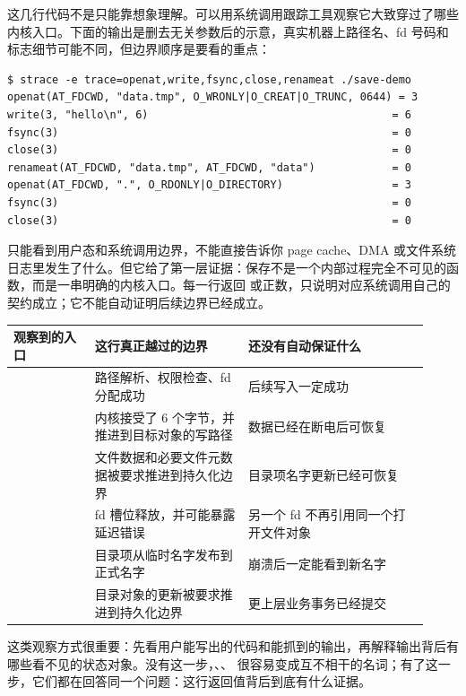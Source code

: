 这几行代码不是只能靠想象理解。可以用系统调用跟踪工具观察它大致穿过了哪些内核入口。下面的输出是删去无关参数后的示意，真实机器上路径名、fd 号码和标志细节可能不同，但边界顺序是要看的重点：

\begin{lstlisting}
$ strace -e trace=openat,write,fsync,close,renameat ./save-demo
openat(AT_FDCWD, "data.tmp", O_WRONLY|O_CREAT|O_TRUNC, 0644) = 3
write(3, "hello\n", 6)                                      = 6
fsync(3)                                                    = 0
close(3)                                                    = 0
renameat(AT_FDCWD, "data.tmp", AT_FDCWD, "data")            = 0
openat(AT_FDCWD, ".", O_RDONLY|O_DIRECTORY)                 = 3
fsync(3)                                                    = 0
close(3)                                                    = 0
\end{lstlisting}

 只能看到用户态和系统调用边界，不能直接告诉你 page cache、DMA 或文件系统日志里发生了什么。但它给了第一层证据：保存不是一个内部过程完全不可见的函数，而是一串明确的内核入口。每一行返回  或正数，只说明对应系统调用自己的契约成立；它不能自动证明后续边界已经成立。

\begin{longtable}{|L{0.18\linewidth}|L{0.34\linewidth}|L{0.4\linewidth}|}
\toprule
观察到的入口 & 这行真正越过的边界 & 还没有自动保证什么 \\
\midrule
{} & 路径解析、权限检查、fd 分配成功 & 后续写入一定成功 \\\tablerowrule
{} & 内核接受了 6 个字节，并推进到目标对象的写路径 & 数据已经在断电后可恢复 \\\tablerowrule
{} & 文件数据和必要文件元数据被要求推进到持久化边界 & 目录项名字更新已经可恢复 \\\tablerowrule
{} & fd 槽位释放，并可能暴露延迟错误 & 另一个 fd 不再引用同一个打开文件对象 \\\tablerowrule
{} & 目录项从临时名字发布到正式名字 & 崩溃后一定能看到新名字 \\\tablerowrule
{} & 目录对象的更新被要求推进到持久化边界 & 更上层业务事务已经提交 \\
\bottomrule
\end{longtable}

这类观察方式很重要：先看用户能写出的代码和能抓到的输出，再解释输出背后有哪些看不见的状态对象。没有这一步，、、 很容易变成互不相干的名词；有了这一步，它们都在回答同一个问题：这行返回值背后到底有什么证据。

